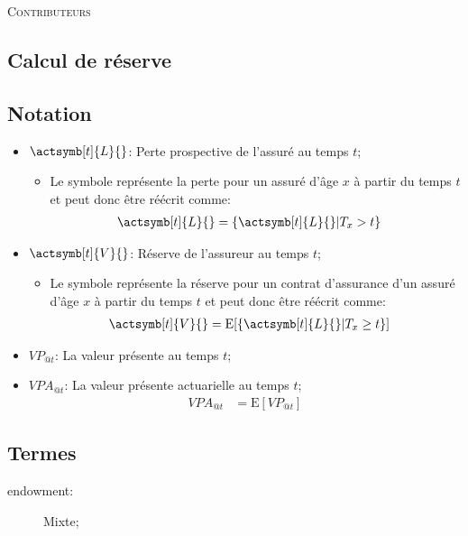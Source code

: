 \documentclass[10pt, french]{article}
\begin{document}
\begin{center}
	\textsc{\Large Contributeurs}\\[0.5cm] 
\end{center}


\newpage

\begin{multicols*}{2} 

\section{Calcul de réserve}

\subsection*{Notation}
\begin{itemize}
	\item[] 	$\actsymb[t]{L}{}$: Perte prospective de l'assuré au temps $t$;
		\begin{itemize}
		\item	Le symbole représente la perte pour un assuré d'âge $x$ à partir du temps $t$ et peut donc être réécrit comme:
			\begin{align*}
			\actsymb[t]{L}{}	
			&=	\{ \actsymb[t]{L}{} | T_{x} > t \}
			\end{align*}
		\end{itemize}
	\item[]	$\actsymb[t]{V}{}$: Réserve de l'assureur au temps $t$;
		\begin{itemize}
		\item	Le symbole représente la réserve pour un contrat d'assurance d'un assuré d'âge $x$ à partir du temps $t$ et peut donc être réécrit comme:
			\begin{align*}
			\actsymb[t]{V}{}	
			&=	\text{E}[\{ \actsymb[t]{L}{} | T_{x} \ge t \}]
			\end{align*}
		\end{itemize}
	\item[]	$VP_{@t}$: La valeur présente au temps $t$;
	\item[]	$VPA_{@t}$: La valeur présente actuarielle au temps $t$;
		\begin{align*}
		VPA_{@t}	
		&=	\text{E}[VP_{@t}]
		\end{align*}
\end{itemize}

\subsection*{Termes}
\begin{description}
	\item[endowment:] Mixte;
\end{description}


\end{multicols*}
\end{document}

